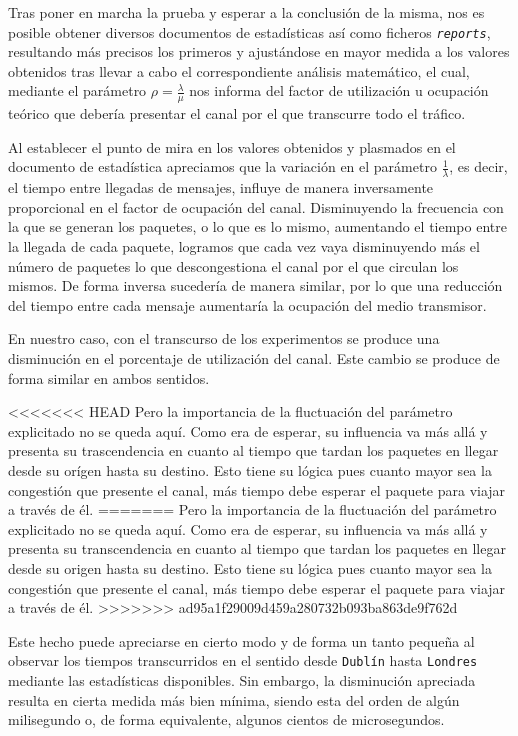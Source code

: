 \documentclass{article}[10pt]
\begin{document}
		Tras poner en marcha la prueba y esperar a la conclusión de la misma, nos es posible obtener diversos documentos de estadísticas así como ficheros \texttt{\textit{reports}}, resultando más precisos los primeros y ajustándose en mayor medida a los valores obtenidos tras llevar a cabo el correspondiente análisis matemático, el cual, mediante el parámetro $\rho = \frac{\lambda}{\mu}$ nos informa del factor de utilización u ocupación teórico que debería presentar el canal por el que transcurre todo el tráfico.

		Al establecer el punto de mira en los valores obtenidos y plasmados en el documento de estadística apreciamos que la variación en el parámetro $\frac{1}{\lambda}$, es decir, el tiempo entre llegadas de mensajes, influye de manera inversamente proporcional en el factor de ocupación del canal. Disminuyendo la frecuencia con la que se generan los paquetes, o lo que es lo mismo, aumentando el tiempo entre la llegada de cada paquete, logramos que cada vez vaya disminuyendo más el número de paquetes lo que descongestiona el canal por el que circulan los mismos. De forma inversa sucedería de manera similar, por lo que una reducción del tiempo entre cada mensaje aumentaría la ocupación del medio transmisor.

		En nuestro caso, con el transcurso de los experimentos se produce una disminución en el porcentaje de utilización del canal. Este cambio se produce de forma similar en ambos sentidos.

<<<<<<< HEAD
		Pero la importancia de la fluctuación del parámetro explicitado no se queda aquí. Como era de esperar, su influencia va más allá y presenta su trascendencia en cuanto al tiempo que tardan los paquetes en llegar desde su orígen hasta su destino. Esto tiene su lógica pues cuanto mayor sea la congestión que presente el canal, más tiempo debe esperar el paquete para viajar a través de él.
=======
		Pero la importancia de la fluctuación del parámetro explicitado no se queda aquí. Como era de esperar, su influencia va más allá y presenta su transcendencia en cuanto al tiempo que tardan los paquetes en llegar desde su origen hasta su destino. Esto tiene su lógica pues cuanto mayor sea la congestión que presente el canal, más tiempo debe esperar el paquete para viajar a través de él.
>>>>>>> ad95a1f29009d459a280732b093ba863de9f762d

		Este hecho puede apreciarse en cierto modo y de forma un tanto pequeña al observar los tiempos transcurridos en el sentido desde \texttt{Dublín} hasta \texttt{Londres} mediante las estadísticas disponibles. Sin embargo, la disminución apreciada resulta en cierta medida más bien mínima, siendo esta del orden de algún milisegundo o, de forma equivalente, algunos cientos de microsegundos.
\end{document}
